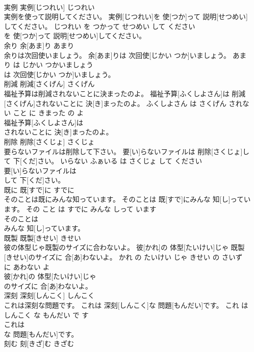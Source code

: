 \documentclass[8pt]{extreport}
\begin{document}
\begin{CJK}{UTF8}{min}
\\	実例	実例[じつれい]	じつれい	
\\	実例を使って説明してください。	実例[じつれい]を 使[つか]って 説明[せつめい]してください。	じつれい を つかって せつめい して ください	
\\	を 使[つか]って 説明[せつめい]してください。			
\\	余り	余[あま]り	あまり	
\\	余りは次回使いましょう。	余[あま]りは 次回使[じかい つか]いましょう。	あまり は じかい つかいましょう	
\\	は 次回使[じかい つか]いましょう。			
\\	削減	削減[さくげん]	さくげん	
\\	福祉予算は削減されないことに決まったのよ。	福祉予算[ふくしよさん]は 削減[さくげん]されないことに 決[き]まったのよ。	ふくしよさん は さくげん されない こと に きまった の よ	
\\	福祉予算[ふくしよさん]は
\\	されないことに 決[き]まったのよ。			
\\	削除	削除[さくじょ]	さくじょ	
\\	要らないファイルは削除して下さい。	要[い]らないファイルは 削除[さくじょ]して 下[くだ]さい。	いらない ふぁいる は さくじょ して ください	
\\	要[い]らないファイルは
\\	して 下[くだ]さい。			
\\	既に	既[すで]に	すでに	
\\	そのことは既にみんな知っています。	そのことは 既[すで]にみんな 知[し]っています。	その こと は すでに みんな しって います	
\\	そのことは
\\	みんな 知[し]っています。			
\\	既製	既製[きせい]	きせい	
\\	彼の体型じゃ既製のサイズに合わないよ。	彼[かれ]の 体型[たいけい]じゃ 既製[きせい]のサイズに 合[あ]わないよ。	かれ の たいけい じゃ きせい の さいず に あわない よ	
\\	彼[かれ]の 体型[たいけい]じゃ
\\	のサイズに 合[あ]わないよ。			
\\	深刻	深刻[しんこく]	しんこく	
\\	これは深刻な問題です。	これは 深刻[しんこく]な 問題[もんだい]です。	これ は しんこく な もんだい で す	
\\	これは
\\	な 問題[もんだい]です。			
\\	刻む	刻[きざ]む	きざむ	

\end{CJK}
\end{document}
